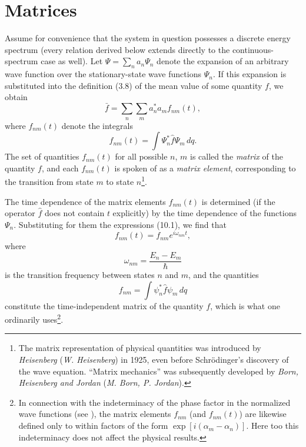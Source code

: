 \section{Matrices}

Assume for convenience that the system in question possesses a discrete
energy spectrum (every relation derived below extends directly to the
continuous-spectrum case as well). Let
$\Psi=\sum_n a_n\Psi_n$ denote the expansion of an arbitrary wave function over
the stationary-state wave functions $\Psi_n$. If this expansion is
substituted into the definition (3.8) of the mean value of some quantity $f$, we
obtain
\begin{equation}
  \bar f=\sum_n\sum_m a_n^*a_m f_{nm}(t),
  \tag{11.1}
\end{equation}
where $f_{nm}(t)$ denote the integrals
\begin{equation}
  f_{nm}(t)=\int\Psi_n^*\hat f\Psi_m\,dq.
  \tag{11.2}
\end{equation}
The set of quantities $f_{nm}(t)$ for all possible $n$, $m$ is called the
\textit{matrix} of the quantity $f$, and each $f_{nm}(t)$ is spoken of as a
\textit{matrix element}, corresponding to the transition from state $m$ to
state $n$\footnote{The matrix representation of physical quantities was introduced
by \textit{Heisenberg} (\textit{W. Heisenberg}) in 1925, even before
Schr\"{o}dinger's discovery of the wave equation. ``Matrix mechanics''
was subsequently developed by \textit{Born, Heisenberg and Jordan}
(\textit{M. Born, P. Jordan}).}.

The time dependence of the matrix elements $f_{nm}(t)$ is determined (if the
operator $\hat f$ does not contain $t$ explicitly) by the time dependence of the
functions $\Psi_n$. Substituting for them the expressions (10.1),
we find that
\begin{equation}
  f_{nm}(t)=f_{nm}e^{i\omega_{nm}t},
  \tag{11.3}
\end{equation}
where
\begin{equation}
  \omega_{nm}=\frac{E_n-E_m}{\hbar}
  \tag{11.4}
\end{equation}
is the transition frequency between states $n$ and $m$, and the quantities
\begin{equation}
  f_{nm}=\int\psi_n^*\hat f\psi_m\,dq
  \tag{11.5}
\end{equation}
constitute the time-independent matrix of the quantity $f$, which is what one
ordinarily uses\footnote{In connection with the indeterminacy of the phase
factor in the normalized wave functions (see ), the matrix elements
$f_{nm}$ (and $f_{nm}(t)$) are likewise defined only to within factors of the
form $\exp[i(\alpha_m-\alpha_n)]$. Here too this indeterminacy does not affect
the physical results.}.

